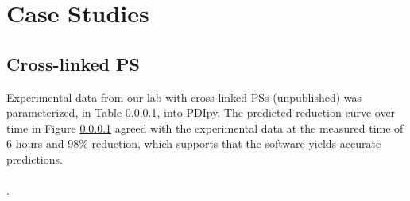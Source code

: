 






\section*{Case Studies}

\subsection*{Cross-linked PS}
Experimental data from our lab with cross-linked PSs (unpublished) was parameterized, in Table \ref{}, into PDIpy. The predicted reduction curve over time in Figure \ref{} agreed with the experimental data at the measured time of 6 hours and 98\% reduction, which supports that the software yields accurate predictions. 

\paragraph{}
.


